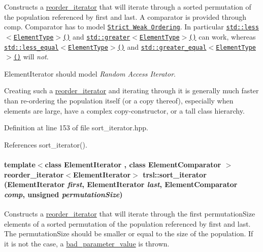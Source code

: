 Constructs a \hyperlink{classtrsl_1_1reorder__iterator}{reorder\_\-iterator} that will iterate through a sorted permutation of the population referenced by {\ttfamily first} and {\ttfamily last}. A comparator is provided through {\ttfamily comp}. {\ttfamily Comparator} has to model \href{http://www.sgi.com/tech/stl/StrictWeakOrdering.html}{\tt Strict Weak Ordering}. In particular \href{http://www.sgi.com/tech/stl/less.html}{\tt {\ttfamily std::less$<$ElementType$>$()}} and \href{http://www.sgi.com/tech/stl/greater.html}{\tt {\ttfamily std::greater$<$ElementType$>$()}} can work, whereas \href{http://www.sgi.com/tech/stl/less_equal.html}{\tt {\ttfamily std::less\_\-equal$<$ElementType$>$()}} and \href{http://www.sgi.com/tech/stl/greater_equal.html}{\tt {\ttfamily std::greater\_\-equal$<$ElementType$>$()}} will {\itshape not\/}.

{\ttfamily ElementIterator} should model {\itshape Random Access Iterator\/}.

Creating such a \hyperlink{classtrsl_1_1reorder__iterator}{reorder\_\-iterator} and iterating through it is generally much faster than re-\/ordering the population itself (or a copy thereof), especially when elements are large, have a complex copy-\/constructor, or a tall class hierarchy. 

Definition at line 153 of file sort\_\-iterator.hpp.

References sort\_\-iterator().\hypertarget{namespacetrsl_aa23892a3c8929e627df1618c6b5dd2df}{
\paragraph[{sort\_\-iterator}]{\setlength{\rightskip}{0pt plus 5cm}template$<$class ElementIterator , class ElementComparator $>$ {\bf reorder\_\-iterator}$<$ElementIterator$>$ trsl::sort\_\-iterator (ElementIterator {\em first}, \/  ElementIterator {\em last}, \/  ElementComparator {\em comp}, \/  unsigned {\em permutationSize})}\hfill}
\label{namespacetrsl_aa23892a3c8929e627df1618c6b5dd2df}


Constructs a \hyperlink{classtrsl_1_1reorder__iterator}{reorder\_\-iterator} that will iterate through the first {\ttfamily permutationSize} elements of a sorted permutation of the population referenced by {\ttfamily first} and {\ttfamily last}. The {\ttfamily permutationSize} should be smaller or equal to the size of the population. If it is not the case, a \hyperlink{classtrsl_1_1bad__parameter__value}{bad\_\-parameter\_\-value} is thrown.

